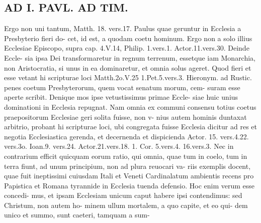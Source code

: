\documentclass{article}
\begin{document}
\begin{pages}
\section*{AD I. PAVL. AD TIM. }
\marginpar{[ p.242 ]}Ergo non uni tantum, Matth. 18. vers.17. Paulus quae geruntur in Ecclesia a Presbyterio fieri do- cet, id est, a quodam coetu hominum. Ergo non a solo illius Ecclesiae Episcopo, supra cap. 4.V.14, Philip. 1.vers.1. Actor.11.vers.30. Deinde Eccle- sia ipsa Dei transformaretur in regnum terrenum, essetque iam Monarchia, non Aristocratia, si unus in ea dominaretur, et omnia solus ageret. Quod fieri et esse vetant hi scripturae loci Matth.2o.V.25 1.Pet.5.vers.3. Hieronym. ad Rustic. penes coetum Presbyterorum, quem vocat senatum morum, cem- suram esse aperte scribit. Denique mos ipse vetustissimus primae Eccle- siae huic unius dominationi in Ecclesia repugnat. Nam omnia ex communi consensu totius coetus praepositorum Ecclesiae geri solita fuisse, non v- nius autem hominis duntaxat arbitrio, probant hi scripturae loci, ubi congregata fuisse Ecclesia dicitur ad res et negotia Ecclesiastica gerenda, et decernenda et dispicienda Actor. 15. vers.4.22. vers.3o. Ioan.9. vers.24. Actor.21.vers.18. 1. Cor. 5.vers.4. 16.vers.3. Nec in contrarium efficit quicquam eorum ratio, qui omnia, quae tum in coelo, tum in terra fiunt, ad unum principium, non ad plura reuocari va- riis exemplis docent, quae fuit ineptissimi cuiusdam Itali et Veneti Cardinalatum ambientis recens pro Papistica et Romana tyrannide in Ecclesia tuenda defensio. Hoc enim verum esse concedi- mus, et ipsam Ecclesiam unicum caput habere ipsi contendimus: sed Christum, non autem ho- minem ullum mortalem, a quo capite, et eo qui- dem unico et summo, sunt caeteri, tamquam a sum- 

\end{pages}
\end{document}

